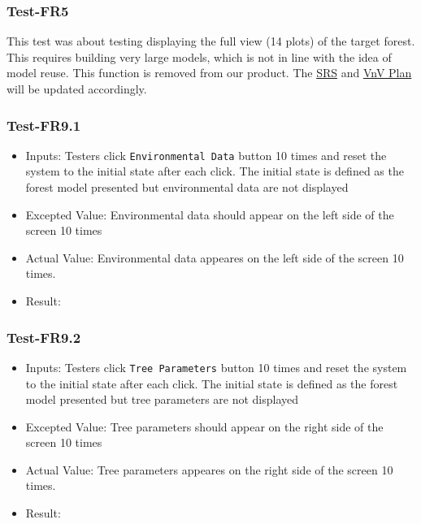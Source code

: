 \documentclass[12pt, titlepage]{article}
\begin{document}
\subsubsection{Test-FR5}
This test was about testing displaying the full view
(14 plots) of the target forest. This requires building very large 
models, which is not in line with the idea of model reuse. This 
function is removed from our product.  The 
\href{https://github.com/wuj187/DigitalTwinCAS/blob/main/docs/SRS/SRS.pdf}{SRS}
and \href{https://github.com/wuj187/DigitalTwinCAS/blob/main/docs/VnVPlan/VnVPlan.pdf}{VnV Plan} will be updated accordingly.

\subsubsection{Test-FR9.1}
\begin{itemize}
    \item Inputs: Testers click \verb|Environmental Data| button
    10 times and reset the system to the initial state after each click.
    The initial state is defined as the forest model presented but environmental 
    data are not displayed
    \item Excepted Value: Environmental data should appear on the left side of the 
    screen 10 times
    \item Actual Value: Environmental data appeares on the left side of the screen 
    10 times.
    \item Result: \pass
\end{itemize}

\subsubsection{Test-FR9.2}
\begin{itemize}
    \item Inputs: Testers click \verb|Tree Parameters| button
    10 times and reset the system to the initial state after each click.
    The initial state is defined as the forest model presented but tree parameters
    are not displayed
    \item Excepted Value: Tree parameters should appear on the right side of the 
    screen 10 times
    \item Actual Value: Tree parameters appeares on the right side of the screen 
    10 times.
    \item Result: \pass
\end{itemize}
\end{document}
